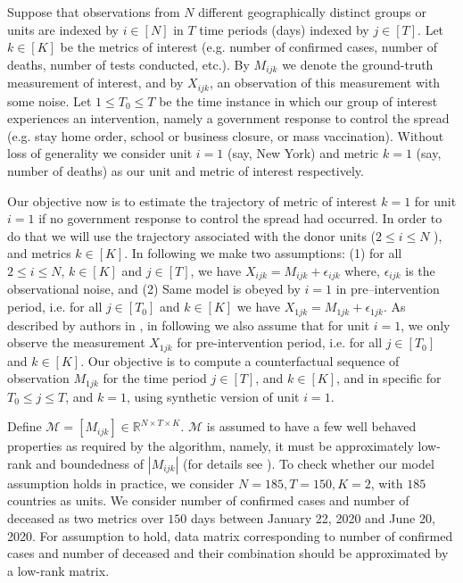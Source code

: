 \documentclass[preprint,authoryear,12pt]{elsarticle}
\begin{document}
	Suppose that observations from $N$ different geographically distinct groups or units are indexed by $i \in [N]$ in $T$ time periods (days) indexed by $j \in [T]$. Let $k \in [K]$ be the metrics of interest (e.g. number of confirmed cases, number of deaths, number of tests conducted, etc.). By $M_{ijk}$ we denote the ground-truth measurement of interest, and by $X_{ijk}$, an observation of this measurement with some noise. Let $1 \leq T_0 \leq T$ be the time instance in which our group of interest experiences an intervention, namely a government response to control the spread (e.g. stay home order, school or business closure, or mass vaccination). Without loss of generality we consider unit $i = 1$ (say, New York) and metric $k = 1$ (say, number of deaths) as our unit and metric of interest respectively.\par
	
	Our objective now is to estimate the trajectory of metric of interest $k = 1$  for unit $i = 1$ if no government response to control the spread had occurred. In order to do that we will use the trajectory associated with the donor units ($2 \leq i \leq N$ ), and metrics $k \in [K ]$. In following we make two assumptions: (1) for all $2 \leq i \leq N$, $k \in [K]$ and $j \in [T]$, we have  $X_{ijk} = M_{ijk} + \epsilon_{ijk}$ where, $\epsilon_{ijk}$ is the observational noise, and (2) Same model is obeyed by $i=1$ in pre--intervention period, i.e. for all $j \in [T_0]$ and $k \in [K]$ we have $X_{1jk} = M_{1jk} + \epsilon_{1jk}$. As described by authors in \cite{AMSS19}, in following we also assume that for unit $i=1$, we only observe the measurement $X_{1jk}$ for pre-intervention period, i.e. for all $j \in [T_0]$ and $k \in [K]$. Our objective is to compute a counterfactual sequence of observation $M_{1jk}$ for the time period $j \in [T]$, and $k \in [K]$, and in specific for $T_0 \leq j \leq T$, and $k = 1$, using synthetic version of unit $i=1$.\par
	
	Define $\mathcal{M} = [M_{ijk}] \in \mathbb{R}^{N \times T \times K}$. $\mathcal{M}$ is assumed to have a few well behaved properties as required by the algorithm, namely, it must be approximately low-rank and boundedness of $\left|M_{ijk}\right|$ (for details see \cite{AMSS19}). To check whether our model assumption holds in practice, we consider $N=185, T=150, K=2$, with $185$ countries as units. We consider number of confirmed cases and number of deceased as two metrics over $150$ days between January 22, 2020 and June 20, 2020. For assumption to hold, data matrix corresponding to number of confirmed cases and number of deceased and their combination should be approximated by a low-rank matrix. 
	
\end{document}
